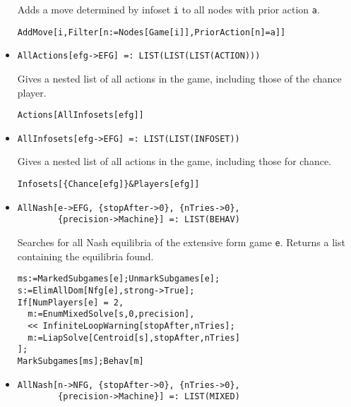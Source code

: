\begin{itemize}
\bd 
Adds a move determined by infoset \verb+i+ to all nodes with prior
action \verb+a+.  
\begin{verbatim}
AddMove[i,Filter[n:=Nodes[Game[i]],PriorAction[n]=a]]
\end{verbatim} 
\ed

\item{}
\protect \large \begin{verbatim}
AllActions[efg->EFG] =: LIST(LIST(LIST(ACTION))) 
\end{verbatim}\normalsize

\bd 
Gives a nested list of all actions in the game, including those of
the chance player.  
\begin{verbatim}
Actions[AllInfosets[efg]]
\end{verbatim} 
\ed

\item{}
\protect \large \begin{verbatim}
AllInfosets[efg->EFG] =: LIST(LIST(INFOSET)) 
\end{verbatim}\normalsize

\bd 
Gives a nested list of all actions in the game, including those for
chance. 
\begin{verbatim}
Infosets[{Chance[efg]}&Players[efg]]
\end{verbatim} 
\ed

\item{}
\protect \large \begin{verbatim}
AllNash[e->EFG, {stopAfter->0}, {nTries->0}, 
        {precision->Machine}] =: LIST(BEHAV) 
\end{verbatim}\normalsize

\bd 
Searches for all Nash equilibria of the extensive form game
\verb+e+.  Returns a list containing the equilibria found.

\begin{verbatim}
ms:=MarkedSubgames[e];UnmarkSubgames[e];
s:=ElimAllDom[Nfg[e],strong->True];
If[NumPlayers[e] = 2, 
  m:=EnumMixedSolve[s,0,precision],
  << InfiniteLoopWarning[stopAfter,nTries];
  m:=LiapSolve[Centroid[s],stopAfter,nTries]
];
MarkSubgames[ms];Behav[m]
\end{verbatim} 
\ed

\item{}
\protect \large \begin{verbatim}
AllNash[n->NFG, {stopAfter->0}, {nTries->0}, 
        {precision->Machine}] =: LIST(MIXED) 
\end{verbatim}\normalsize


\end{itemize}
